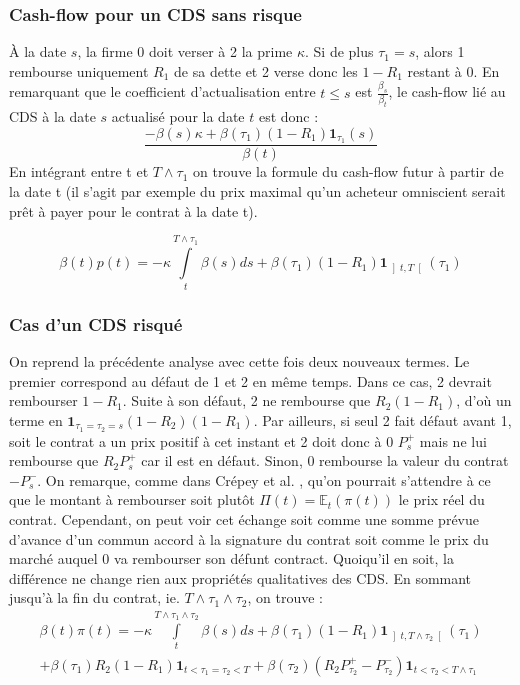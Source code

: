 \documentclass[a4paper]{article}
\theoremstyle{definition}
\theoremstyle{remark}
\begin{document}
\subsubsection{Cash-flow pour un CDS sans risque}
À la date $s$, la firme 0 doit verser à 2 la prime $\kappa$.
 Si de plus $\tau_1 = s$, alors 1 rembourse uniquement $R_1$ de sa dette et 2 verse donc les $1-R_1$ restant à 0.
 En remarquant que le coefficient d'actualisation entre $t\leq s$ est $\frac{\beta_{s}}{\beta_{t}}$, le cash-flow lié au CDS à la date $s$ actualisé pour la date $t$ est donc : 
\begin{equation*}
\frac{- \beta(s) \kappa+ \beta(\tau_{1}) \left( 1 - R_{1} \right)  \mathbf{ 1 }_{\tau_{1} } \left( s \right) }{\beta (t)} 
\end{equation*}
En intégrant entre t et $T \wedge \tau_{1}$ on trouve la formule du cash-flow futur à partir de la date t (il s'agit par exemple du prix maximal qu'un acheteur omniscient serait prêt à payer pour le contrat à la date t).

\begin{equation}
\beta (t) p(t) = -\kappa \int\limits_{t}^{T \wedge \tau_{1}} \beta(s)ds + \beta(\tau_{1})\left( 1 - R_{1} \right)\mathbf{ 1 }_{\left] t, T \right[}(\tau_{1})
\end{equation}
\subsubsection{Cas d'un CDS risqué}
On reprend la précédente analyse avec cette fois deux nouveaux termes.
 Le premier correspond au défaut de 1 et 2 en même temps.
 Dans ce cas, 2 devrait rembourser $1-R_{1}$.
 Suite à son défaut, 2 ne rembourse que $R_{2}(1-R_{1})$, d'où un terme en $\mathbf{1}_{\tau_{1} = \tau_{2} = s} (1-R_{2})(1-R_{1})$.
 Par ailleurs, si seul 2 fait défaut avant 1, soit le contrat a un prix positif à cet instant et 2 doit donc à 0 $P_{s}^{+}$ mais ne lui rembourse que $R_{2}P_{s}^{+}$ car il est en défaut.
 Sinon, 0 rembourse la valeur du contrat $-P_{s}^{-}$. On remarque, comme dans Crépey et al. \cite{B}, qu'on pourrait s'attendre à ce que le montant à rembourser soit plutôt $\Pi (t) = \mathbb{E}_t (\pi (t))$ le prix réel du contrat. Cependant, on peut voir cet échange soit comme une somme prévue d'avance d'un commun accord à la signature du contrat soit comme le prix du marché auquel 0 va rembourser son défunt contract. Quoiqu'il en soit, la différence ne change rien aux propriétés qualitatives des CDS.
 En sommant jusqu'à la fin du contrat, ie.
 $T \wedge \tau_{1} \wedge \tau_{2}$, on trouve :
\begin{multline}
\beta(t)\pi(t) = -\kappa \int\limits_{t}^{T \wedge \tau_{1} \wedge \tau_{2}} \beta(s)ds + \beta\left(\tau_{1}\right)\left( 1 - R_{1} \right)\mathbf{ 1 }_{\left] t, T \wedge \tau_{2} \right[}(\tau_{1}) \\
+ \beta(\tau_{1}) R_{2} \left( 1 - R_{1} \right) \mathbf{1}_{t < \tau_{1} = \tau_{2} < T} 
+ \beta(\tau_{2}) \left( R_{2}P_{\tau_{2}}^{+} - P_{\tau_{2}}^{-} \right) \mathbf{1}_{t < \tau_{2} < T \wedge \tau_{1}}
\end{multline}
~~\\\\
\end{document}
